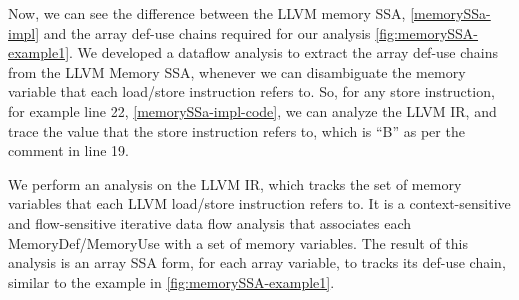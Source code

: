 Now, we can see the difference between the LLVM memory SSA, 
\autoref{memorySSa-impl} and the array def-use chains  
required for our analysis \autoref{fig:memorySSA-example1}.
We developed a dataflow analysis to 
extract the 
array def-use chains from the LLVM Memory SSA, whenever we can disambiguate the memory variable
that each load/store instruction refers to. 
So, for any store instruction, for example line 22, \autoref{memorySSa-impl-code}, we can analyze the 
LLVM IR, and trace the value that the store instruction refers to, 
which is ``B'' as per the comment in line 19. 

We perform an analysis 
on the LLVM IR, which tracks the set of memory variables that each 
LLVM load/store instruction refers to. 
It is a context-sensitive and flow-sensitive 
iterative data flow analysis that associates each MemoryDef/MemoryUse with a set of memory variables. The result of this analysis is an
array SSA form, for each array variable, to tracks its def-use chain, 
similar to the example in \autoref{fig:memorySSA-example1}.
\vspace*{-10pt}

